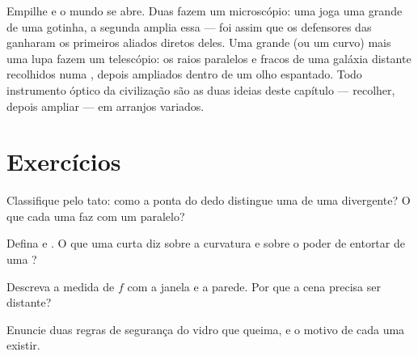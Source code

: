 \begin{remark}\label{rem:g8:lenses-images:instruments}
Empilhe  e o mundo se abre. Duas  fazem um
microscópio: uma joga uma  grande de uma gotinha, a
segunda amplia essa  --- foi assim que os defensores das
 ganharam os primeiros aliados diretos deles. Uma 
grande (ou um  curvo) mais uma lupa fazem um telescópio: os
raios paralelos e fracos de uma galáxia distante recolhidos numa
, depois ampliados dentro de um olho espantado. Todo
instrumento óptico da civilização são as duas ideias deste capítulo
--- recolher, depois ampliar --- em arranjos variados.
\end{remark}

\section{Exercícios}

\begin{exercise}[$\star$]\label{exo:g8:lenses-images:1}
Classifique pelo tato: como a ponta do dedo distingue uma  de uma divergente? O que cada uma faz com um 
paralelo?
\end{exercise}

\begin{exercise}[$\star$]\label{exo:g8:lenses-images:2}
Defina  e . O que uma  curta diz
sobre a curvatura e sobre o poder de entortar de uma ?
\end{exercise}

\begin{exercise}[$\star$]\label{exo:g8:lenses-images:3}
Descreva a medida de $f$ com a janela e a parede. Por que a cena
precisa ser distante?
\end{exercise}

\begin{exercise}[$\star$]\label{exo:g8:lenses-images:4}
Enuncie duas regras de segurança do vidro que queima, e o motivo de
cada uma existir.
\end{exercise}

